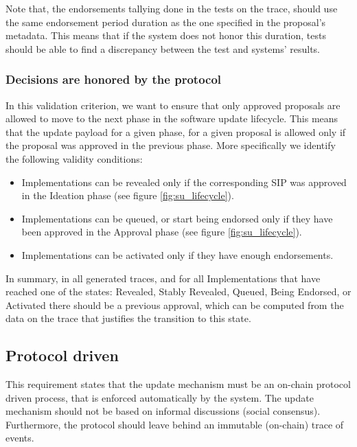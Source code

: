 Note that, the endorsements tallying done in the tests on the trace, should use
the
same endorsement period duration as the one specified in the proposal's
metadata.
This means that if the system does not honor this duration, tests should be
able to find a discrepancy between the test and systems' results.

\subsubsection{Decisions are honored by the
	protocol}\label{vc:Decisions-are-honored-by-the-protocol}

In this validation criterion, we want to ensure that only approved proposals
are
allowed to move to the next phase in the software update lifecycle. This means
that the update payload for a
given phase, for a given proposal is allowed only if the
proposal was approved in the previous phase. More specifically we identify the
following validity conditions:

\begin{itemize}
	\item Implementations can be revealed only if the corresponding SIP was
	approved in the Ideation phase (see figure \ref{fig:su_lifecycle}).
	\item Implementations can be queued, or start being endorsed only if they
	have been approved in the Approval phase (see figure
	\ref{fig:su_lifecycle}).
	\item Implementations can be activated only if they have enough
	endorsements.
\end{itemize}

In summary, in all generated traces, and for all
Implementations that have reached one of the states: Revealed, Stably Revealed,
Queued, Being Endorsed, or Activated there should be a previous approval, which
can be computed from the data on the trace that justifies the transition to
this state.

\subsection{Protocol driven}\label{sec:protocol_driven}
This requirement states that the update mechanism must be an on-chain protocol
driven process, that is
enforced automatically by the system. The update mechanism should not be based
on informal discussions (social consensus). Furthermore, the protocol should
leave behind an immutable (on-chain) trace of events.

